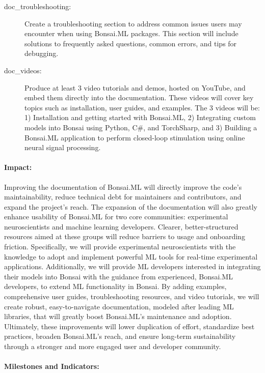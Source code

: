 \begin{description}
    \item[doc\_troubleshooting:] Create a troubleshooting section to address common issues users may encounter when using Bonsai.ML packages. This section will include solutions to frequently asked questions, common errors, and tips for debugging.
    
    \item[doc\_videos:] Produce at least 3 video tutorials and demos, hosted on YouTube, and embed them directly into the documentation. These videos will cover key topics such as installation, user guides, and examples. The 3 videos will be: 1) Installation and getting started with Bonsai.ML, 2) Integrating custom models into Bonsai using Python, C\#, and TorchSharp, and 3) Building a Bonsai.ML application to perform closed-loop stimulation using online neural signal processing.

\end{description}

\paragraph{Impact:}
Improving the documentation of Bonsai.ML will directly improve the code's maintainability, reduce technical debt for maintainers and contributors, and expand the project's reach. The expansion of the documentation will also greatly enhance usability of Bonsai.ML for two core communities: experimental neuroscientists and machine learning developers. Clearer, better-structured resources aimed at these groups will reduce barriers to usage and onboarding friction. Specifically, we will provide experimental neuroscientists with the knowledge to adopt and implement powerful ML tools for real-time experimental applications. Additionally, we will provide ML developers interested in integrating their models into Bonsai with the guidance from experienced, Bonsai.ML developers, to extend ML functionality in Bonsai. By adding examples, comprehensive user guides, troubleshooting resources, and video tutorials, we will create robust, easy-to-navigate documentation, modeled after leading ML libraries, that will greatly boost Bonsai.ML's maintenance and adoption. Ultimately, these improvements will lower duplication of effort, standardize best practices, broaden Bonsai.ML's reach, and ensure long-term sustainability through a stronger and more engaged user and developer community.

\paragraph{Milestones and Indicators:}\mbox{}\\

